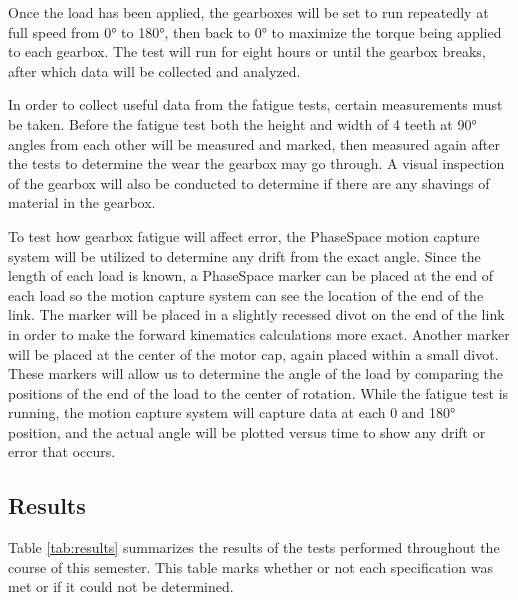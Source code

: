 Once the load has been applied, the gearboxes will be set to run repeatedly at full speed from 0° to 180°, then back to 0° to maximize the torque being applied to each gearbox. The test will run for eight hours or until the gearbox breaks, after which data will be collected and analyzed.

In order to collect useful data from the fatigue tests, certain measurements must be taken. Before the fatigue test both the height and width of 4 teeth at 90° angles from each other will be measured and marked, then measured again after the tests to determine the wear the gearbox may go through. A visual inspection of the gearbox will also be conducted to determine if there are any shavings of material in the gearbox.

To test how gearbox fatigue will affect error, the PhaseSpace motion capture system will be utilized to determine any drift from the exact angle. Since the length of each load is known, a PhaseSpace marker can be placed at the end of each load so the motion capture system can see the location of the end of the link. The marker will be placed in a slightly recessed divot on the end of the link in order to make the forward kinematics calculations more exact. Another marker will be placed at the center of the motor cap, again placed within a small divot. These markers will allow us to determine the angle of the load by comparing the positions of the end of the load to the center of rotation. While the fatigue test is running, the motion capture system will capture data at each 0 and 180° position, and the actual angle will be plotted versus time to show any drift or error that occurs.

\newpage
\subsection{Results}\label{sec:conc}
Table \ref{tab:results} summarizes the results of the tests performed throughout the course of this semester. This table marks whether or not each specification was met or if it could not be determined.

